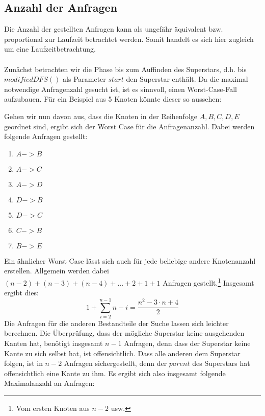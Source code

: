 \documentclass[a4paper, notitlepage, 12pt]{scrartcl}
\begin{document}
\subsection{Anzahl der Anfragen}
Die Anzahl der gestellten Anfragen kann als ungefähr äquivalent bzw. proportional zur Laufzeit betrachtet werden. Somit handelt es sich hier zugleich um eine Laufzeitbetrachtung. \\ \\
Zunächst betrachten wir die Phase bis zum Auffinden des Superstars, d.h. bis $modifiedDFS()$ als Parameter $start$ den Superstar enthält. Da die maximal notwendige Anfragenzahl gesucht ist, ist es sinnvoll, einen Worst-Case-Fall aufzubauen. Für ein Beispiel aus 5 Knoten könnte dieser so aussehen:
\begin{center}
\end{center}
Gehen wir nun davon aus, dass die Knoten in der Reihenfolge ${A,B,C,D,E}$ geordnet sind, ergibt sich der Worst Case für die Anfragenanzahl. Dabei werden folgende Anfragen gestellt:
\begin{enumerate}
  \item $A -> B$
  \item $A -> C$
  \item $A -> D$
  \item $D -> B$
  \item $D -> C$
  \item $C -> B$
  \item $B -> E$
\end{enumerate}
Ein ähnlicher Worst Case lässt sich auch für jede beliebige andere Knotenanzahl erstellen. Allgemein werden dabei $(n - 2) + (n -3) + (n - 4) + ... + 2 + 1 + 1$ Anfragen gestellt.\footnote{Vom ersten Knoten aus $n - 2$ usw.} Insgesamt ergibt dies:
\begin{equation*}
  1 + \sum_{i = 2}^{n - 1} n - i = \frac{n^{2} - 3 \cdot n + 4}{2}
\end{equation*}
Die Anfragen für die anderen Bestandteile der Suche lassen sich leichter berechnen. Die Überprüfung, dass der mögliche Superstar keine ausgehenden Kanten hat, benötigt insgesamt $n - 1$ Anfragen, denn dass der Superstar keine Kante zu sich selbst hat, ist offensichtlich. Dass alle anderen dem Superstar folgen, ist in $n - 2$ Anfragen sichergestellt, denn der $parent$ des Superstars hat offensichtlich eine Kante zu ihm. Es ergibt sich also insgesamt folgende Maximalanzahl an Anfragen:
\end{document}
